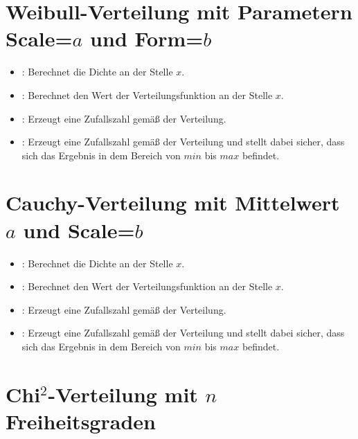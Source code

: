 \section{Weibull-Verteilung mit Parametern Scale=\texorpdfstring{$a$}{a} und Form=\texorpdfstring{$b$}{b}}

\begin{itemize}

\item
{}:
Berechnet die Dichte an der Stelle $x$.

\item
{}:
Berechnet den Wert der Verteilungsfunktion an der Stelle $x$.

\item
{}:
Erzeugt eine Zufallszahl gemäß der Verteilung.

\item
{}:
Erzeugt eine Zufallszahl gemäß der Verteilung und stellt dabei sicher, dass sich das Ergebnis in dem Bereich von $min$ bis $max$ befindet.

\end{itemize}



\section{Cauchy-Verteilung mit Mittelwert \texorpdfstring{$a$}{a} und Scale=\texorpdfstring{$b$}{b}}

\begin{itemize}

\item
{}:
Berechnet die Dichte an der Stelle $x$.

\item
{}:
Berechnet den Wert der Verteilungsfunktion an der Stelle $x$.

\item
{}:
Erzeugt eine Zufallszahl gemäß der Verteilung.

\item
{}:
Erzeugt eine Zufallszahl gemäß der Verteilung und stellt dabei sicher, dass sich das Ergebnis in dem Bereich von $min$ bis $max$ befindet.

\end{itemize}



\section{\texorpdfstring{Chi$^2$}{Chi2}-Verteilung mit \texorpdfstring{$n$}{n} Freiheitsgraden}

